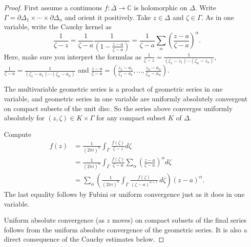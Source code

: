 \documentclass[12pt,openany]{book}
\newcommand{\C}{{\mathbb{C}}}
\theoremstyle{plain}
\theoremstyle{remark}
\theoremstyle{definition}
\theoremstyle{exercise}
\theoremstyle{example}
\begin{document}
\begin{proof}
First assume a continuous $f \colon \overline{\Delta} \to \C$ is holomorphic
on $\Delta$.
Write
$\Gamma = \partial \Delta_1 \times \cdots \times \partial \Delta_n$
and orient it positively.
Take $z \in \Delta$ and $\zeta \in \Gamma$.
As in one variable, write the Cauchy kernel as
\begin{equation*}
\frac{1}{\zeta-z} =
\frac{1}{\zeta-a}\frac{1}{\left(1-\frac{z-a}{\zeta-a}\right)} =
\frac{1}{\zeta-a}
\sum_{\alpha}
{\left(\frac{z-a}{\zeta-a}\right)}^\alpha .
\end{equation*}
Here, make sure you interpret the formulas as
$\frac{1}{\zeta-z} = \frac{1}{(\zeta_1-z_1) \cdots (\zeta_n-z_n)}$,
$\frac{1}{\zeta-a} = \frac{1}{(\zeta_1-a_1) \cdots (\zeta_n-a_n)}$
and
$\frac{z-a}{\zeta-a} =
\left(
\frac{z_1-a_1}{\zeta_1-a_1}, \ldots,
\frac{z_n-a_n}{\zeta_n-a_n}
\right)$.

The multivariable geometric series is a product of geometric series
in one variable, and geometric series in one variable
are uniformly absolutely convergent on compact subsets of the unit disc.
So the series
above converges uniformly absolutely for $(z,\zeta) \in K \times \Gamma$ 
for any compact subset $K$ of $\Delta$.

Compute
\begin{equation*}
\begin{split}
f(z)
& =
\frac{1}{{(2\pi i)}^n}
\int_{\Gamma}
\frac{f(\zeta)}{\zeta-z}
d \zeta 
\\
& =
\frac{1}{{(2\pi i)}^n}
\int_{\Gamma}
\frac{f(\zeta)}{\zeta-a}
\sum_{\alpha}
{\left(\frac{z-a}{\zeta-a}\right)}^{\alpha}
d \zeta 
\\
& =
\sum_{\alpha}
\left(
\frac{1}{{(2\pi i)}^n}
\int_{\Gamma}
\frac{f(\zeta)}{{(\zeta-a)}^{\alpha+1}}
\,
d \zeta 
\right)
{(z-a)}^{\alpha} .
\end{split}
\end{equation*}
The last equality follows by Fubini or uniform convergence just as it does in one variable.

Uniform absolute convergence (as $z$ moves) on compact subsets of the final
series follows from the
uniform absolute convergence of the geometric series.  It is also a direct
consequence of the Cauchy estimates below.


\end{proof}
\end{document}
